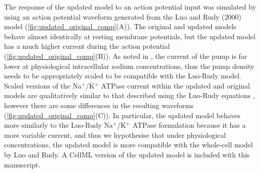 \documentclass[fleqn,10pt]{physiome}
\begin{document}
The response of the updated model to an action potential input was simulated by using an action potential waveform generated from the Luo and Rudy (2000) model \citep{faber_action_2000,luo_dynamic_1994} (\autoref{fig:updated_original_comp}(A)). The original and updated models behave almost identically at resting membrane potentials, but the updated model has a much higher current during the action potential (\autoref{fig:updated_original_comp}(B)). As noted in  \citet{terkildsen_modelling_2006}, the current of the pump is far lower at physiological intracellular sodium concentrations, thus the pump density needs to be appropriately scaled to be compatible with the Luo-Rudy model. Scaled versions of the Na$^+$/K$^+$ ATPase current within the updated and original models are qualitatively similar to that described using the Luo-Rudy equations \citep{faber_action_2000,luo_dynamic_1994}, however there are some differences in the resulting waveforms (\autoref{fig:updated_original_comp}(C)). In particular, the updated model behaves more similarly to the Luo-Rudy Na$^+$/K$^+$ ATPase formulation because it has a more variable current, and thus we hypothesise that under physiological concentrations, the updated model is more compatible with the whole-cell model by Luo and Rudy. A CellML version of the updated model is included with this manuscript.
\end{document}
